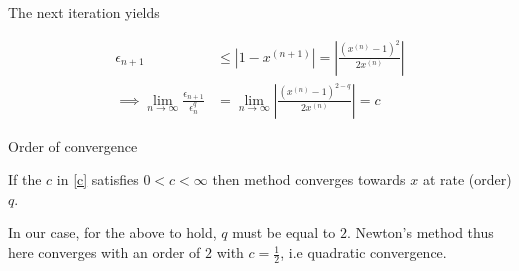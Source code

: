 \documentclass[00-main.tex]{subfiles}
\begin{document}
The next iteration yields

\begin{align}
\epsilon_{n+1} &\leq | 1 - x^{(n+1)}| = \left| \frac{(x^{(n)}-1)^2}{2x^{(n)}} \right| \\
\implies
\lim_{n \rightarrow \infty} \frac{\epsilon_{n+1}}{\epsilon_n^q} &= \lim_{n \rightarrow \infty} 
\label{c}
\left| \frac{(x^{(n)}-1)^{2-q}}{2x^{(n)}} \right| = c
\end{align}

\begin{listing*}
\caption*{Order of convergence}
If the $c$ in \cref{c} satisfies $0<c<\infty$ then method converges towards $x$ at rate (order) $q$. 
\end{listing*}

In our case, for the above to hold, $q$ must be equal to $2$. Newton's method thus here converges with an order of $2$ with $c=\frac{1}{2}$, i.e quadratic convergence.




\end{document}
